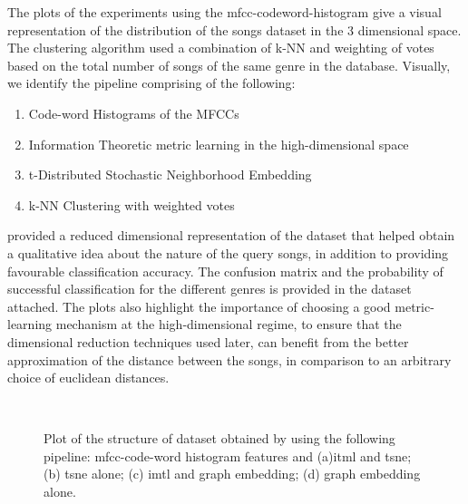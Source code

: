 \documentclass[10pt]{article}
\begin{document}
The plots of the experiments using the mfcc-codeword-histogram give a visual representation of the distribution of the songs dataset in the 3 dimensional space. The clustering algorithm used a combination of k-NN and weighting of votes based on the total number of songs of the same genre in the database. Visually, we identify the pipeline comprising of the following:
\begin{enumerate}
\item Code-word Histograms of the MFCCs
\item Information Theoretic metric learning in the high-dimensional space
\item t-Distributed Stochastic Neighborhood Embedding
\item k-NN Clustering with weighted votes
\end{enumerate} 
provided a reduced dimensional representation of the dataset that helped obtain a qualitative idea about the nature of the query songs, in addition to providing favourable classification accuracy. The confusion matrix and the probability of successful classification for the different genres is provided in the dataset attached. 
The plots also highlight the importance of choosing a good metric-learning mechanism at the high-dimensional regime, to ensure that the dimensional reduction techniques used later, can benefit from the better approximation of the distance between the songs, in comparison to an arbitrary choice of euclidean distances. 

\begin{figure}[h!]
\\
\caption{Plot of the structure of dataset obtained by using the following pipeline: mfcc-code-word histogram features and (a)itml and tsne; (b) tsne alone; (c) imtl and graph embedding; (d) graph embedding alone.}
\label{fig:mfccw_dataview}
\end{figure}
\end{document}
